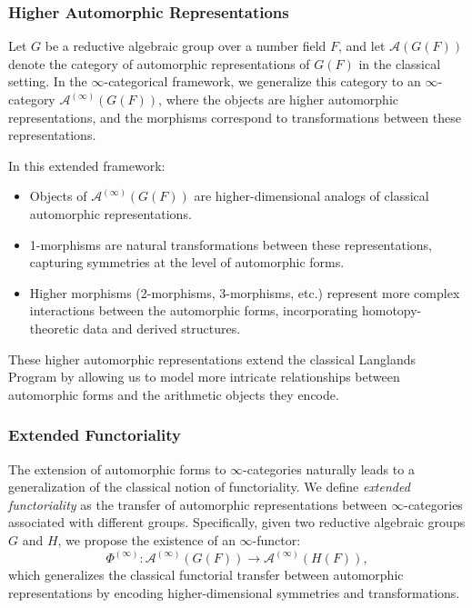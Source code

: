 \documentclass{article}
\theoremstyle{remark}
\begin{document}
\subsubsection{Higher Automorphic Representations}

Let $G$ be a reductive algebraic group over a number field $F$, and let $\mathcal{A}(G(F))$ denote the category of automorphic representations of $G(F)$ in the classical setting. In the $\infty$-categorical framework, we generalize this category to an $\infty$-category $\mathcal{A}^{(\infty)}(G(F))$, where the objects are higher automorphic representations, and the morphisms correspond to transformations between these representations.

In this extended framework:
\begin{itemize}
    \item Objects of $\mathcal{A}^{(\infty)}(G(F))$ are higher-dimensional analogs of classical automorphic representations.
    \item 1-morphisms are natural transformations between these representations, capturing symmetries at the level of automorphic forms.
    \item Higher morphisms (2-morphisms, 3-morphisms, etc.) represent more complex interactions between the automorphic forms, incorporating homotopy-theoretic data and derived structures.
\end{itemize}

These higher automorphic representations extend the classical Langlands Program by allowing us to model more intricate relationships between automorphic forms and the arithmetic objects they encode.

\subsubsection{Extended Functoriality}

The extension of automorphic forms to $\infty$-categories naturally leads to a generalization of the classical notion of functoriality. We define \textit{extended functoriality} as the transfer of automorphic representations between $\infty$-categories associated with different groups. Specifically, given two reductive algebraic groups $G$ and $H$, we propose the existence of an $\infty$-functor:
\[
\Phi^{(\infty)}: \mathcal{A}^{(\infty)}(G(F)) \to \mathcal{A}^{(\infty)}(H(F)),
\]
which generalizes the classical functorial transfer between automorphic representations by encoding higher-dimensional symmetries and transformations.
\end{document}
